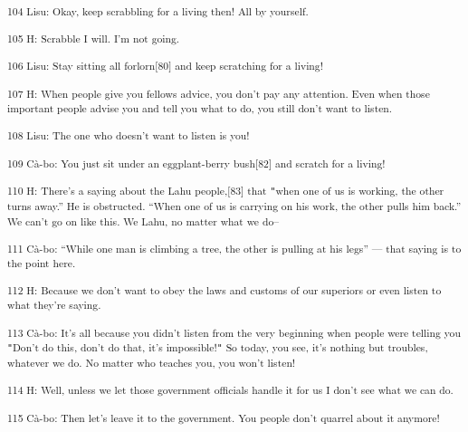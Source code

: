{\textsuperscript{104 Lisu: Okay, keep scrabbling for a living then! All
by yourself.}}

{\textsuperscript{105 H: Scrabble I will. I'm not going.}}

{\textsuperscript{106 Lisu: Stay sitting all forlorn[80] and keep scratching
for a living!}}

{\textsuperscript{107 H: When people give you fellows advice, you don't
pay any attention. Even when those important people advise you and tell you what
to do, you still don't want to listen.}}

{\textsuperscript{108 Lisu: The one who doesn't want to listen is you!}}

{\textsuperscript{109 Cà-bo: You just sit under an eggplant-berry bush[82]
and scratch for a living!}}

{\textsuperscript{110 H: There's a saying about the Lahu people,[83] that
\texttt{"}when one of us is working, the other turns away.'' He is obstructed.
``When one of us is carrying on his work, the other pulls him back.'' We can't
go on like this. We Lahu, no matter what we do--}}

{\textsuperscript{111 Cà-bo: ``While one man is climbing a tree, the other
is pulling at his legs'' --- that saying is to the point here.}}

{\textsuperscript{112 H: Because we don't want to obey the laws and customs
of our superiors or even listen to what they're saying.}}

{\textsuperscript{113 Cà-bo: It's all because you didn't listen from the
very beginning when people were telling you \texttt{"}Don't do this, don't do that,
it's impossible!\texttt{"} So today, you see, it's nothing but troubles, whatever
we do. No matter who teaches you, you won't listen!}}

{\textsuperscript{114 H: Well, unless we let those government officials
handle it for us I don't see what we can do. }}

{\textsuperscript{115 Cà-bo: Then let's leave it to the government. You
people don't quarrel about it anymore!}}


